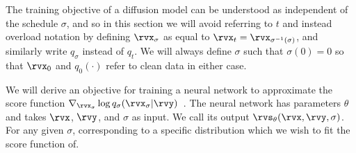 The training objective of a diffusion model can be understood as independent of the schedule $\sigma$, and so in this section we will avoid referring to $t$ and instead overload notation by defining $\rvx_\sigma$ as equal to $\rvx_t = \rvx_{\sigma^{-1}(\sigma)}$, and similarly write $q_\sigma$ instead of $q_t$. We will always define $\sigma$ such that $\sigma(0) = 0$ so that $\rvx_0$ and $q_0(\cdot)$ refer to clean data in either case.

We will derive an objective for training a neural network to approximate the score function $\nabla_{\rvx_\sigma} \log q_\sigma(\rvx_\sigma |\rvy)$~\citep{vincent2011connection,song2019generative}. The neural network has parameters $\theta$ and takes $\rvx$, $\rvy$, and $\sigma$ as input. We call its output $\rvs_\theta(\rvx, \rvy, \sigma)$. For any given $\sigma$, corresponding to a specific distribution which we wish to fit the score function of. 


